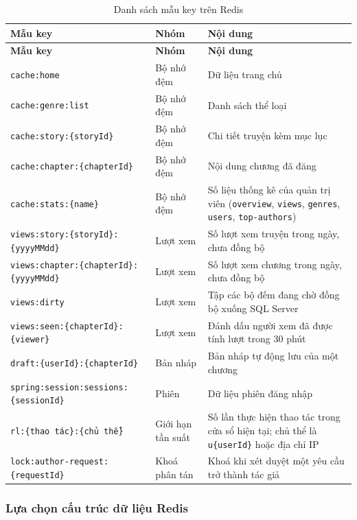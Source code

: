{\small
\renewcommand{\arraystretch}{1.25}
\begin{longtable}{|>{\raggedright\arraybackslash}p{6.9cm}|>{\raggedright\arraybackslash}p{2.5cm}|>{\raggedright\arraybackslash}p{6.0cm}|}
\caption{Danh sách mẫu key trên Redis}\label{tab:redis-keys}\\
\hline
\textbf{Mẫu key} & \textbf{Nhóm} & \textbf{Nội dung} \\ \hline
\endfirsthead
\hline
\textbf{Mẫu key} & \textbf{Nhóm} & \textbf{Nội dung} \\ \hline
\endhead
\texttt{cache:home} & Bộ nhớ đệm & Dữ liệu trang chủ \\ \hline
\texttt{cache:genre:list} & Bộ nhớ đệm & Danh sách thể loại \\ \hline
\texttt{cache:story:\{storyId\}} & Bộ nhớ đệm & Chi tiết truyện kèm mục lục \\ \hline
\texttt{cache:chapter:\{chapterId\}} & Bộ nhớ đệm & Nội dung chương đã đăng \\ \hline
\texttt{cache:stats:\{name\}} & Bộ nhớ đệm & Số liệu thống kê của quản trị viên (\texttt{overview}, \texttt{views}, \texttt{genres}, \texttt{users}, \texttt{top-authors}) \\ \hline
\texttt{views:story:\{storyId\}:\{yyyyMMdd\}} & Lượt xem & Số lượt xem truyện trong ngày, chưa đồng bộ \\ \hline
\texttt{views:chapter:\{chapterId\}:\{yyyyMMdd\}} & Lượt xem & Số lượt xem chương trong ngày, chưa đồng bộ \\ \hline
\texttt{views:dirty} & Lượt xem & Tập các bộ đếm đang chờ đồng bộ xuống SQL Server \\ \hline
\texttt{views:seen:\{chapterId\}:\{viewer\}} & Lượt xem & Đánh dấu người xem đã được tính lượt trong 30 phút \\ \hline
\texttt{draft:\{userId\}:\{chapterId\}} & Bản nháp & Bản nháp tự động lưu của một chương \\ \hline
\texttt{spring:session:sessions:\{sessionId\}} & Phiên & Dữ liệu phiên đăng nhập \\ \hline
\texttt{rl:\{thao tác\}:\{chủ thể\}} & Giới hạn tần suất & Số lần thực hiện thao tác trong cửa sổ hiện tại; chủ thể là \texttt{u\{userId\}} hoặc địa chỉ IP \\ \hline
\texttt{lock:author-request:\{requestId\}} & Khoá phân tán & Khoá khi xét duyệt một yêu cầu trở thành tác giả \\ \hline
\end{longtable}
}

\subsubsection{Lựa chọn cấu trúc dữ liệu Redis}
\label{subsubsec:redis-structures}

